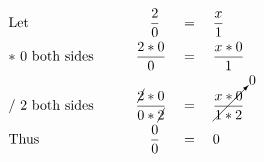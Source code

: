 \begin{alignat*}{3}
&\mathrm{Let}&&\qquad\quad\frac{2}{0}&&=\quad\frac{x}{1}\\
&\mathrm{*~0~both~sides}&&\qquad\frac{2*0}{0}&&=\quad\frac{x*0}{1}\\
&\mathrm{/~2~both~sides}&&\qquad\frac{\cancel{2}*0}{0*\cancel{2}}&&=\quad\cancelto{0}{\frac{x*0}{1*2}}\\
&\mathrm{Thus}&&\qquad\quad\frac{0}{0}&&=\quad0
\end{alignat*}
